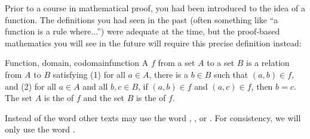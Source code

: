 \documentclass{book}
\theoremstyle{ekimcustom}
\newcommand\defn[1]{{\color{blue}{\bf #1}}}
\begin{document}
Prior to a course in mathematical proof, you had been introduced to the idea of a function. The definitions you had seen in the past (often something like ``a function is a rule where...'') were adequate at the time, but the proof-based mathematics you will see in the future will require this precise definition instead:
\begin{bdefinition}{Function, domain, codomain}{function}
A \defn{function} $f$ from a set $A$ to a set $B$ is a relation from $A$ to $B$ satisfying (1) for all $a \in A$, there is a $b \in B$ such that $(a,b) \in f$, and (2) for all $a \in A$ and all $b, c \in B$, if $(a,b) \in f$ and $(a,c) \in f$, then $b=c$.
\vskip6pt
The set $A$ is the \defn{domain} of $f$ and the set $B$ is the \defn{codomain} of $f$.
\end{bdefinition}
Instead of the word \defn{function} other texts may use the word \defn{map}, \defn{mapping}, or \defn{transformation}. For consistency, we will only use the word \defn{function}.
\end{document}
